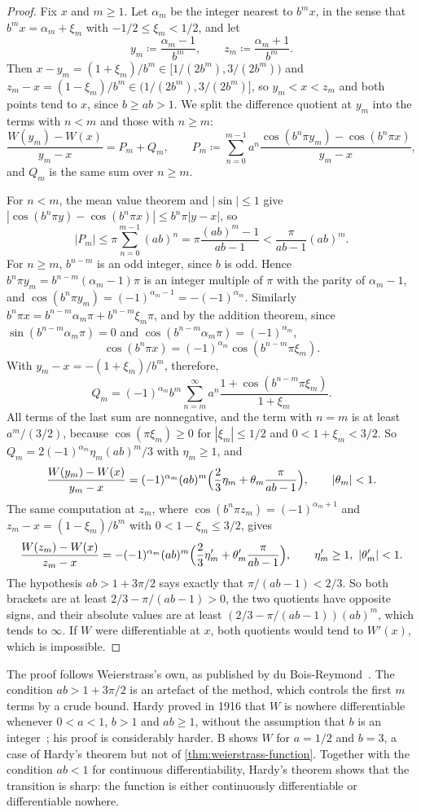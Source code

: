 \begin{proof}
Fix $x$ and $m\ge1$. Let $\alpha_m$ be the integer nearest to $b^mx$, in the sense that $b^mx=\alpha_m+\xi_m$ with $-1/2\le\xi_m<1/2$, and let
\[
y_m\coloneqq\frac{\alpha_m-1}{b^m},\qquad z_m\coloneqq\frac{\alpha_m+1}{b^m} .
\]
Then $x-y_m=(1+\xi_m)/b^m\in[1/(2b^m),3/(2b^m))$ and $z_m-x=(1-\xi_m)/b^m\in(1/(2b^m),3/(2b^m)]$, so $y_m<x<z_m$ and both points tend to $x$, since $b\ge ab>1$. We split the difference quotient at $y_m$ into the terms with $n<m$ and those with $n\ge m$:
\[
\frac{W(y_m)-W(x)}{y_m-x}=P_m+Q_m,\qquad P_m\coloneqq\sum_{n=0}^{m-1}a^n\frac{\cos(b^n\pi y_m)-\cos(b^n\pi x)}{y_m-x},
\]
and $Q_m$ is the same sum over $n\ge m$.

For $n<m$, the mean value theorem and $|\sin|\le1$ give $|\cos(b^n\pi y)-\cos(b^n\pi x)|\le b^n\pi|y-x|$, so
\[
|P_m|\le\pi\sum_{n=0}^{m-1}(ab)^n=\pi\frac{(ab)^m-1}{ab-1}<\frac{\pi}{ab-1}(ab)^m .
\]
For $n\ge m$, $b^{n-m}$ is an odd integer, since $b$ is odd. Hence $b^n\pi y_m=b^{n-m}(\alpha_m-1)\pi$ is an integer multiple of $\pi$ with the parity of $\alpha_m-1$, and $\cos(b^n\pi y_m)=(-1)^{\alpha_m-1}=-(-1)^{\alpha_m}$. Similarly $b^n\pi x=b^{n-m}\alpha_m\pi+b^{n-m}\xi_m\pi$, and by the addition theorem, since $\sin(b^{n-m}\alpha_m\pi)=0$ and $\cos(b^{n-m}\alpha_m\pi)=(-1)^{\alpha_m}$,
\[
\cos(b^n\pi x)=(-1)^{\alpha_m}\cos(b^{n-m}\pi\xi_m) .
\]
With $y_m-x=-(1+\xi_m)/b^m$, therefore,
\[
Q_m=(-1)^{\alpha_m}b^m\sum_{n=m}^\infty a^n\frac{1+\cos(b^{n-m}\pi\xi_m)}{1+\xi_m} .
\]
All terms of the last sum are nonnegative, and the term with $n=m$ is at least $a^m/(3/2)$, because $\cos(\pi\xi_m)\ge0$ for $|\xi_m|\le1/2$ and $0<1+\xi_m<3/2$. So $Q_m=2(-1)^{\alpha_m}\eta_m(ab)^m/3$ with $\eta_m\ge1$, and
\[
\frac{W(y_m)-W(x)}{y_m-x}=(-1)^{\alpha_m}(ab)^m\Bigl(\frac23\eta_m+\theta_m\frac\pi{ab-1}\Bigr),\qquad|\theta_m|<1 .
\]
The same computation at $z_m$, where $\cos(b^n\pi z_m)=(-1)^{\alpha_m+1}$ and $z_m-x=(1-\xi_m)/b^m$ with $0<1-\xi_m\le3/2$, gives
\[
\frac{W(z_m)-W(x)}{z_m-x}=-(-1)^{\alpha_m}(ab)^m\Bigl(\frac23\eta_m'+\theta_m'\frac\pi{ab-1}\Bigr),\qquad\eta_m'\ge1,\ |\theta_m'|<1 .
\]
The hypothesis $ab>1+3\pi/2$ says exactly that $\pi/(ab-1)<2/3$. So both brackets are at least $2/3-\pi/(ab-1)>0$, the two quotients have opposite signs, and their absolute values are at least $(2/3-\pi/(ab-1))(ab)^m$, which tends to $\infty$. If $W$ were differentiable at $x$, both quotients would tend to $W'(x)$, which is impossible.
\end{proof}

The proof follows Weierstrass's own, as published by du Bois-Reymond~\cite{duboisreymond1875}. The condition $ab>1+3\pi/2$ is an artefact of the method, which controls the first $m$ terms by a crude bound. Hardy proved in 1916 that $W$ is nowhere differentiable whenever $0<a<1$, $b>1$ and $ab\ge1$, without the assumption that $b$ is an integer~\cite{hardy1916}; his proof is considerably harder. B shows $W$ for $a=1/2$ and $b=3$, a case of Hardy's theorem but not of \cref{thm:weierstrass-function}. Together with the condition $ab<1$ for continuous differentiability, Hardy's theorem shows that the transition is sharp: the function is either continuously differentiable or differentiable nowhere.

